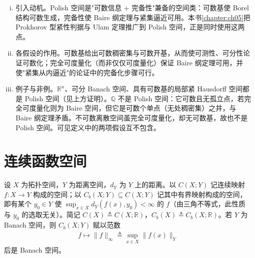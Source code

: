 \documentclass[../main.tex]{subfiles}
\begin{document}
\begin{remark}\label{remark:appA-Polish}
\begin{enumerate}[(i)]
\item 引入动机。Polish 空间是"可数信息 + 完备性"兼备的空间类：可数基使 Borel 结构可数生成，完备性使 Baire 纲定理与紧集逼近可用。本书\cref{chapter:ch05}把 Prokhorov 型紧性判据与 Ulam 定理推广到 Polish 空间，正是同时使用这两点。
\item 各假设的作用。可数基给出可数稠密集与可数开基，从而使可测性、可分性论证可数化；完全可度量化（而非仅仅可度量化）保证 Baire 纲定理可用，并使"紧集从内逼近"的论证中的完备化步骤可行。
\item 例子与非例。$\mathbb{R}^n$、可分 Banach 空间、具有可数基的局部紧 Hausdorff 空间都是 Polish 空间（见上方证明）。$\mathbb{Q}$ 不是 Polish 空间：它可数且无孤立点，若完全可度量化则为 Baire 空间，但它是可数个单点（无处稠密集）之并，与 Baire 纲定理矛盾。不可数离散空间虽完全可度量化，却无可数基，故也不是 Polish 空间。可见定义中的两项假设互不包含。
\end{enumerate}
\end{remark}

\section{连续函数空间}\label{section:appA-连续函数空间}

\begin{definition}[连续函数空间 $C$ 与 $C_b$]\label{definition:appA-C与Cb}
设 $X$ 为拓扑空间，$Y$ 为距离空间，$d_Y$ 为 $Y$ 上的距离。以 $C(X;Y)$ 记连续映射 $f:X\to Y$ 构成的空间；以 $C_b(X;Y)\subseteq C(X;Y)$ 记其中有界映射构成的空间，即有某个 $y_0\in Y$ 使 $\sup_{x\in X}d_Y(f(x),y_0)<\infty$ 的 $f$（由三角不等式，此性质与 $y_0$ 的选取无关）。简记 $C(X)\triangleq C(X;\mathbb{R})$，$C_b(X)\triangleq C_b(X;\mathbb{R})$。若 $Y$ 为 Banach 空间，则 $C_b(X;Y)$ 赋以范数
\begin{align*}
f\mapsto\|f\|_\infty\triangleq\sup_{x\in X}\|f(x)\|_Y
\end{align*}
后是 Banach 空间。
\end{definition}
\end{document}
